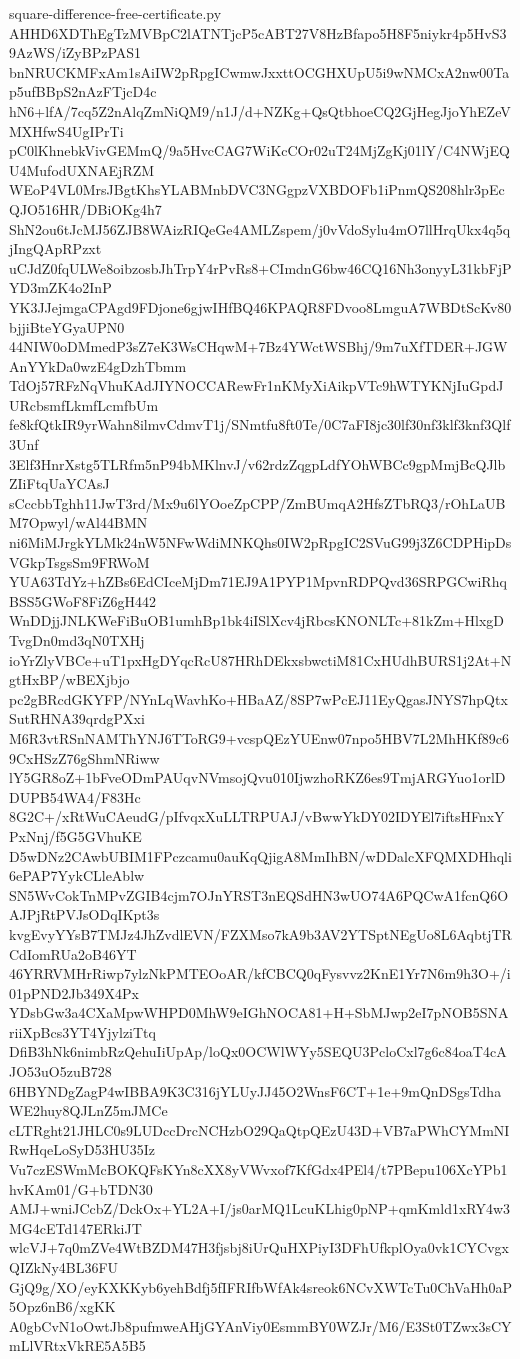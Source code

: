 \documentclass[11pt]{article}
\theoremstyle{definition}
\theoremstyle{remark}
\begin{document}
\begin{filecontents*}[overwrite]{square-difference-free-certificate.py}
AHHD6XDThEgTzMVBpC2lATNTjcP5cABT27V8HzBfapo5H8F5niykr4p5HvS39AzWS/iZyBPzPAS1
bnNRUCKMFxAm1sAiIW2pRpgICwmwJxxttOCGHXUpU5i9wNMCxA2nw00Tap5ufBBpS2nAzFTjcD4c
hN6+lfA/7cq5Z2nAlqZmNiQM9/n1J/d+NZKg+QsQtbhoeCQ2GjHegJjoYhEZeVMXHfwS4UgIPrTi
pC0lKhnebkVivGEMmQ/9a5HvcCAG7WiKcCOr02uT24MjZgKj01lY/C4NWjEQU4MufodUXNAEjRZM
WEoP4VL0MrsJBgtKhsYLABMnbDVC3NGgpzVXBDOFb1iPnmQS208hlr3pEcQJO516HR/DBiOKg4h7
ShN2ou6tJcMJ56ZJB8WAizRIQeGe4AMLZspem/j0vVdoSylu4mO7llHrqUkx4q5qjIngQApRPzxt
uCJdZ0fqULWe8oibzosbJhTrpY4rPvRs8+CImdnG6bw46CQ16Nh3onyyL31kbFjPYD3mZK4o2InP
YK3JJejmgaCPAgd9FDjone6gjwIHfBQ46KPAQR8FDvoo8LmguA7WBDtScKv80bjjiBteYGyaUPN0
44NIW0oDMmedP3sZ7eK3WsCHqwM+7Bz4YWctWSBhj/9m7uXfTDER+JGWAnYYkDa0wzE4gDzhTbmm
TdOj57RFzNqVhuKAdJIYNOCCARewFr1nKMyXiAikpVTc9hWTYKNjIuGpdJURcbsmfLkmfLcmfbUm
fe8kfQtkIR9yrWahn8ilmvCdmvT1j/SNmtfu8ft0Te/0C7aFI8jc30lf30nf3klf3knf3Qlf3Unf
3Elf3HnrXstg5TLRfm5nP94bMKlnvJ/v62rdzZqgpLdfYOhWBCc9gpMmjBcQJlbZIiFtqUaYCAsJ
sCccbbTghh11JwT3rd/Mx9u6lYOoeZpCPP/ZmBUmqA2HfsZTbRQ3/rOhLaUBM7Opwyl/wAl44BMN
ni6MiMJrgkYLMk24nW5NFwWdiMNKQhs0IW2pRpgIC2SVuG99j3Z6CDPHipDsVGkpTsgsSm9FRWoM
YUA63TdYz+hZBs6EdCIceMjDm71EJ9A1PYP1MpvnRDPQvd36SRPGCwiRhqBSS5GWoF8FiZ6gH442
WnDDjjJNLKWeFiBuOB1umhBp1bk4iISlXcv4jRbcsKNONLTc+81kZm+HlxgDTvgDn0md3qN0TXHj
ioYrZlyVBCe+uT1pxHgDYqcRcU87HRhDEkxsbwctiM81CxHUdhBURS1j2At+NgtHxBP/wBEXjbjo
pc2gBRcdGKYFP/NYnLqWavhKo+HBaAZ/8SP7wPcEJ11EyQgasJNYS7hpQtxSutRHNA39qrdgPXxi
M6R3vtRSnNAMThYNJ6TToRG9+vcspQEzYUEnw07npo5HBV7L2MhHKf89c69CxHSzZ76gShmNRiww
lY5GR8oZ+1bFveODmPAUqvNVmsojQvu010IjwzhoRKZ6es9TmjARGYuo1orlDDUPB54WA4/F83Hc
8G2C+/xRtWuCAeudG/pIfvqxXuLLTRPUAJ/vBwwYkDY02IDYEl7iftsHFnxYPxNnj/f5G5GVhuKE
D5wDNz2CAwbUBIM1FPczcamu0auKqQjigA8MmIhBN/wDDalcXFQMXDHhqli6ePAP7YykCLleAblw
SN5WvCokTnMPvZGIB4cjm7OJnYRST3nEQSdHN3wUO74A6PQCwA1fcnQ6OAJPjRtPVJsODqIKpt3s
kvgEvyYYsB7TMJz4JhZvdlEVN/FZXMso7kA9b3AV2YTSptNEgUo8L6AqbtjTRCdIomRUa2oB46YT
46YRRVMHrRiwp7ylzNkPMTEOoAR/kfCBCQ0qFysvvz2KnE1Yr7N6m9h3O+/i01pPND2Jb349X4Px
YDsbGw3a4CXaMpwWHPD0MhW9eIGhNOCA81+H+SbMJwp2eI7pNOB5SNAriiXpBcs3YT4YjylziTtq
DfiB3hNk6nimbRzQehuIiUpAp/loQx0OCWlWYy5SEQU3PcloCxl7g6c84oaT4cAJO53uO5zuB728
6HBYNDgZagP4wIBBA9K3C316jYLUyJJ45O2WnsF6CT+1e+9mQnDSgsTdhaWE2huy8QJLnZ5mJMCe
cLTRght21JHLC0s9LUDccDrcNCHzbO29QaQtpQEzU43D+VB7aPWhCYMmNIRwHqeLoSyD53HU35Iz
Vu7czESWmMcBOKQFsKYn8cXX8yVWvxof7KfGdx4PEl4/t7PBepu106XcYPb1hvKAm01/G+bTDN30
AMJ+wniJCcbZ/DckOx+YL2A+I/js0arMQ1LcuKLhig0pNP+qmKmld1xRY4w3MG4cETd147ERkiJT
wlcVJ+7q0mZVe4WtBZDM47H3fjsbj8iUrQuHXPiyI3DFhUfkplOya0vk1CYCvgxQIZkNy4BL36FU
GjQ9g/XO/eyKXKKyb6yehBdfj5fIFRIfbWfAk4sreok6NCvXWTcTu0ChVaHh0aP5Opz6nB6/xgKK
A0gbCvN1oOwtJb8pufmweAHjGYAnViy0EsmmBY0WZJr/M6/E3St0TZwx3sCYmLlVRtxVkRE5A5B5

\end{filecontents*}
\end{document}
